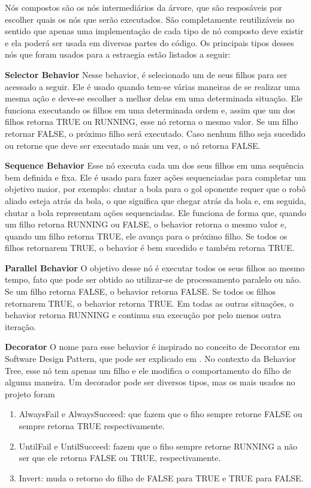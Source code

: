 \documentclass[a4paper,12pt]{article}
\begin{document}
Nós compostos são os nós intermediários da árvore, que  são resposáveis por escolher quais os nós que serão executados. São completamente reutilizáveis no sentido que apenas uma implementação de cada tipo de nó composto deve existir e ela poderá ser usada em diversas partes do código. Os principais tipos desses nós que foram usados para a estraegia estão listados a seguir:

\textbf{Selector Behavior} Nesse behavior, é selecionado um de seus filhos para ser acessado a seguir. Ele é usado quando tem-se várias maneiras de se realizar uma mesma ação e deve-se escolher a melhor delas em uma determinada situação. Ele funciona executando os filhos em uma determinada ordem e, assim que um dos filhos retorna TRUE ou RUNNING, esse nó retorna o mesmo valor. Se um filho retornar FALSE, o próximo filho será executado. Caso nenhum filho seja sucedido ou retorne que deve ser executado mais um vez, o nó retorna FALSE.

\textbf{Sequence Behavior} Esse nó executa cada um dos seus filhos em uma sequência bem definida e fixa. Ele é usado para fazer ações sequenciadas para completar um objetivo maior, por exemplo: chutar a bola para o gol oponente requer que o robô aliado esteja atrás da bola, o que significa que chegar atrás da bola e, em seguida, chutar a bola representam ações sequenciadas. Ele funciona de forma que, quando um filho retorna RUNNING ou FALSE, o behavior retorna o mesmo valor e, quando um filho retorna TRUE, ele avança para o próximo filho. Se todos os filhos retornarem TRUE, o behavior é bem sucedido e também retorna TRUE.

\textbf{Parallel Behavior} O objetivo desse nó é executar todos os seus filhos ao mesmo tempo, fato que pode ser obtido ao utilizar-se de processamento paralelo ou não. Se um filho retorna FALSE, o behavior retorna FALSE. Se todos os filhos retornarem TRUE, o behavior retorna TRUE. Em todas as outras situações, o behavior retorna RUNNING e continua sua execução por pelo menos outra iteração.

\textbf{Decorator} O nome para esse behavior é inspirado no conceito de Decorator em Software Design Pattern, que pode ser explicado em \cite{hunt2013gang}. No contexto da Behavior Tree, esse nó tem apenas um filho e ele modifica o comportamento do filho de alguma maneira. Um decorador pode ser diversos tipos, mas os mais usados no projeto foram 

\begin{enumerate}
\item AlwaysFail e AlwaysSucceed: que fazem que o fiho sempre retorne FALSE ou sempre retorna TRUE respectivamente.
\item UntilFail e UntilSucceed: fazem que o fiho sempre retorne RUNNING a não ser que ele retorna FALSE ou TRUE, respectivamente.
\item Invert: muda o retorno do filho de FALSE para TRUE e TRUE para FALSE.
\end{enumerate}
\end{document}
